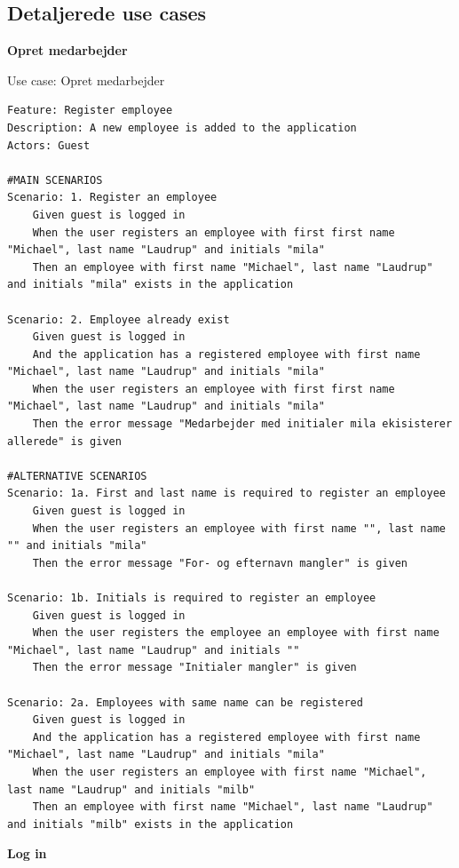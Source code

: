 \subsection{Detaljerede use cases}
\textbf{Opret medarbejder}
\begin{listing}[H]
    \centering
    \caption{Use case: Opret medarbejder}\label{lst:usecase_register_employee}
    \begin{verbatim}  
Feature: Register employee
Description: A new employee is added to the application
Actors: Guest

#MAIN SCENARIOS
Scenario: 1. Register an employee
    Given guest is logged in
    When the user registers an employee with first first name "Michael", last name "Laudrup" and initials "mila"
    Then an employee with first name "Michael", last name "Laudrup" and initials "mila" exists in the application

Scenario: 2. Employee already exist
    Given guest is logged in
    And the application has a registered employee with first name "Michael", last name "Laudrup" and initials "mila"
    When the user registers an employee with first first name "Michael", last name "Laudrup" and initials "mila"
    Then the error message "Medarbejder med initialer mila ekisisterer allerede" is given

#ALTERNATIVE SCENARIOS
Scenario: 1a. First and last name is required to register an employee
    Given guest is logged in
    When the user registers an employee with first name "", last name "" and initials "mila"
    Then the error message "For- og efternavn mangler" is given

Scenario: 1b. Initials is required to register an employee
    Given guest is logged in
    When the user registers the employee an employee with first name "Michael", last name "Laudrup" and initials ""
    Then the error message "Initialer mangler" is given

Scenario: 2a. Employees with same name can be registered
    Given guest is logged in
    And the application has a registered employee with first name "Michael", last name "Laudrup" and initials "mila"
    When the user registers an employee with first name "Michael", last name "Laudrup" and initials "milb"
    Then an employee with first name "Michael", last name "Laudrup" and initials "milb" exists in the application
    \end{verbatim}
\end{listing}
\textbf{Log in}
